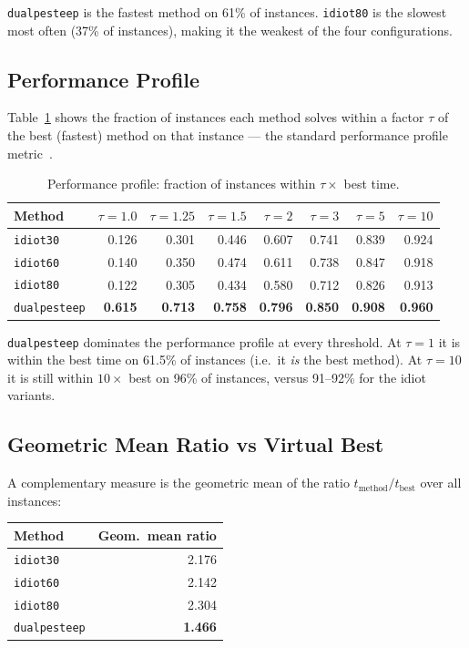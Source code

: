 \documentclass[11pt,a4paper]{article}
\newcommand{\best}[1]{\cellcolor{bestcell}\textbf{#1}}
\begin{document}
\texttt{dualpesteep} is the fastest method on 61\% of instances. \texttt{idiot80}
is the slowest most often (37\% of instances), making it the weakest of the four
configurations.

\subsection{Performance Profile}

Table~\ref{tab:profile} shows the fraction of instances each method solves within
a factor $\tau$ of the best (fastest) method on that instance — the standard
performance profile metric~\cite{dolan2002}.

\begin{table}[h]
\centering
\caption{Performance profile: fraction of instances within $\tau \times$ best time.}
\label{tab:profile}
\begin{tabular}{lrrrrrrr}
\toprule
\textbf{Method} & $\tau{=}1.0$ & $\tau{=}1.25$ & $\tau{=}1.5$ & $\tau{=}2$ & $\tau{=}3$ & $\tau{=}5$ & $\tau{=}10$ \\
\midrule
\texttt{idiot30}     & 0.126 & 0.301 & 0.446 & 0.607 & 0.741 & 0.839 & 0.924 \\
\texttt{idiot60}     & 0.140 & 0.350 & 0.474 & 0.611 & 0.738 & 0.847 & 0.918 \\
\texttt{idiot80}     & 0.122 & 0.305 & 0.434 & 0.580 & 0.712 & 0.826 & 0.913 \\
\texttt{dualpesteep} & \best{0.615} & \best{0.713} & \best{0.758} & \best{0.796} & \best{0.850} & \best{0.908} & \best{0.960} \\
\bottomrule
\end{tabular}
\end{table}

\texttt{dualpesteep} dominates the performance profile at every threshold.
At $\tau=1$ it is within the best time on 61.5\% of instances (i.e.\ it \emph{is}
the best method). At $\tau=10$ it is still within $10\times$ best on 96\% of
instances, versus 91--92\% for the idiot variants.

\subsection{Geometric Mean Ratio vs Virtual Best}

A complementary measure is the geometric mean of the ratio $t_{\text{method}} /
t_{\text{best}}$ over all instances:

\begin{center}
\begin{tabular}{lr}
\toprule
\textbf{Method} & \textbf{Geom.\ mean ratio} \\
\midrule
\texttt{idiot30}     & 2.176 \\
\texttt{idiot60}     & 2.142 \\
\texttt{idiot80}     & 2.304 \\
\texttt{dualpesteep} & \best{1.466} \\
\bottomrule
\end{tabular}
\end{center}
\end{document}
